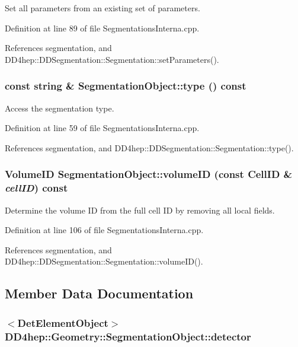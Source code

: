 Set all parameters from an existing set of parameters. 

Definition at line 89 of file SegmentationsInterna.cpp.

References segmentation, and DD4hep::DDSegmentation::Segmentation::setParameters().\hypertarget{class_d_d4hep_1_1_geometry_1_1_segmentation_object_abbf94d0c2dc6014127573a8b8c93d2d8}{
\subsubsection[{type}]{\setlength{\rightskip}{0pt plus 5cm}const {\bf string} \& SegmentationObject::type () const}}
\label{class_d_d4hep_1_1_geometry_1_1_segmentation_object_abbf94d0c2dc6014127573a8b8c93d2d8}


Access the segmentation type. 

Definition at line 59 of file SegmentationsInterna.cpp.

References segmentation, and DD4hep::DDSegmentation::Segmentation::type().\hypertarget{class_d_d4hep_1_1_geometry_1_1_segmentation_object_a1e49d904fd608d2ad07299269e7a1348}{
\subsubsection[{volumeID}]{\setlength{\rightskip}{0pt plus 5cm}VolumeID SegmentationObject::volumeID (const CellID \& {\em cellID}) const}}
\label{class_d_d4hep_1_1_geometry_1_1_segmentation_object_a1e49d904fd608d2ad07299269e7a1348}


Determine the volume ID from the full cell ID by removing all local fields. 

Definition at line 106 of file SegmentationsInterna.cpp.

References segmentation, and DD4hep::DDSegmentation::Segmentation::volumeID().

\subsection{Member Data Documentation}
\hypertarget{class_d_d4hep_1_1_geometry_1_1_segmentation_object_aa9f9012806e2dfff465ae66650f10b94}{
\subsubsection[{detector}]{$<${\bf DetElementObject}$>$ {\bf DD4hep::Geometry::SegmentationObject::detector}}}
\label{class_d_d4hep_1_1_geometry_1_1_segmentation_object_aa9f9012806e2dfff465ae66650f10b94}


